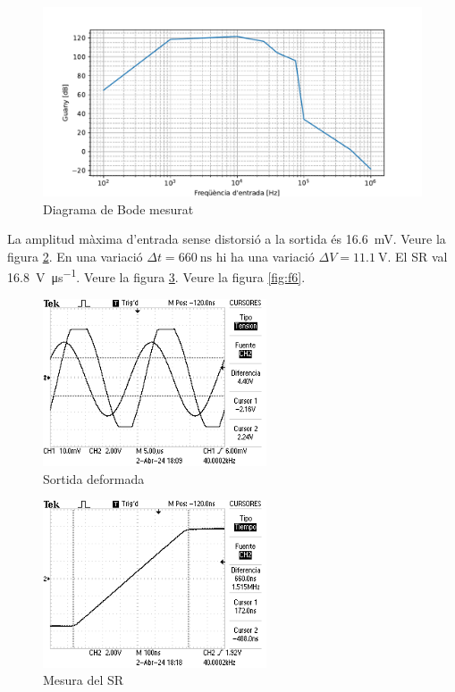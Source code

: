 \documentclass[catalan, a4paper, nobib]{tufte-handout}
\begin{document}
\begin{figure}[h]
  \begin{center}
    \includegraphics[width=450px]{s2_graph.pdf}
  \end{center}
  \caption{Diagrama de Bode mesurat}
  \label{fig:f3}
\end{figure}

 La amplitud màxima d'entrada sense distorsió a la sortida és \qty{16.6}{\milli\volt}. Veure la figura \ref{fig:f4}.
 En una variació $\Delta t = \qty{660}{\nano\second}$ hi ha una variació $\Delta V = \qty{11.1}{\volt}$. El SR val \qty{16.8}{\volt\per\micro\second}. Veure la figura \ref{fig:f5}.
 Veure la figura \ref{fig:f6}.

\newpage

\begin{figure}[h]
  \begin{center}
    \includegraphics[width=250px]{P4S2_2.png}
  \end{center}
  \caption{Sortida deformada}
  \label{fig:f4}
\end{figure}

\begin{figure}[h]
  \begin{center}
    \includegraphics[width=250px]{P4S2_3.png}
  \end{center}
  \caption{Mesura del SR}
  \label{fig:f5}
\end{figure}
\end{document}
